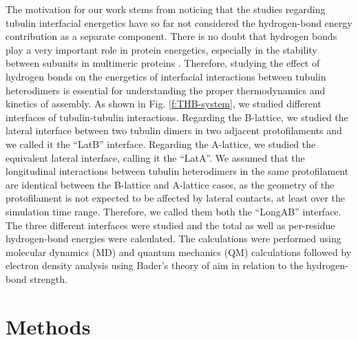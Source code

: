 \documentclass[11pt]{report}
\begin{document}
The motivation for our work stems from noticing that the
studies regarding tubulin interfacial energetics have so far not considered the hydrogen-bond energy contribution as a separate component. There is no doubt that hydrogen bonds play a very important role in protein energetics, especially in the stability between subunits in multimeric proteins
\cite{Hellgren2007,Rose2006}. 
Therefore, studying the effect of hydrogen bonds on the energetics of interfacial interactions between tubulin heterodimers is essential for understanding the proper thermodynamics and kinetics of assembly. As shown in 
Fig. \ref{f:THB-system}, we studied different interfaces of tubulin-tubulin interactions. Regarding the B-lattice, we studied the lateral
interface between two tubulin dimers in two adjacent protofilaments and we called it the ``LatB'' interface. Regarding the A-lattice, we studied the equivalent lateral interface, calling it the ``LatA''. We assumed that the longitudinal interactions between tubulin heterodimers in the same protofilament are identical between the B-lattice and A-lattice cases, as the geometry of the protofilament is not expected to be affected by lateral contacts, at least over the simulation time range. Therefore, we called them both the ``LongAB'' interface. The three different interfaces were studied and the total as well as per-residue hydrogen-bond energies were calculated. The calculations were performed using molecular dynamics (MD) and quantum mechanics (QM) calculations followed by electron density analysis using Bader's theory of \gls{aim}
\cite{Bader1990,Bader1991} in relation to the hydrogen-bond strength.

\section{Methods}
\label{s:THB-Methods}
\end{document}
